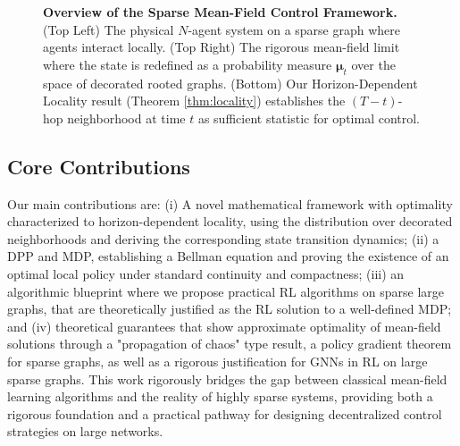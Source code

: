 \documentclass{article}
\begin{document}
\begin{figure}[t]
{
  }
  \caption{\textbf{Overview of the Sparse Mean-Field Control Framework.} (Top Left) The physical $N$-agent system on a sparse graph where agents interact locally. (Top Right) The rigorous mean-field limit where the state is redefined as a probability measure $\boldsymbol{\mu}_t$ over the space of decorated rooted graphs. (Bottom) Our Horizon-Dependent Locality result (Theorem \ref{thm:locality}) establishes the $(T-t)$-hop neighborhood at time $t$ as sufficient statistic for optimal control.}
  \label{fig:overview1}
\end{figure}

\subsection{Core Contributions}
Our main contributions are: (i) A novel mathematical framework with optimality characterized to horizon-dependent locality, using the distribution over decorated neighborhoods and deriving the corresponding state transition dynamics; (ii) a DPP and MDP, establishing a Bellman equation and proving the existence of an optimal local policy under standard continuity and compactness; (iii) an algorithmic blueprint where we propose practical RL algorithms on sparse large graphs, that are theoretically justified as the RL solution to a well-defined MDP; and (iv) theoretical guarantees that show approximate optimality of mean-field solutions through a "propagation of chaos" type result, a policy gradient theorem for sparse graphs, as well as a rigorous justification for GNNs in RL on large sparse graphs. This work rigorously bridges the gap between classical mean-field learning algorithms and the reality of highly sparse systems, providing both a rigorous foundation and a practical pathway for designing decentralized control strategies on large networks.
\end{document}
